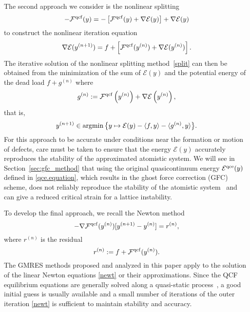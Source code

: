 \documentclass[12pt,reqno]{amsart}
\begin{document}
The second approach we consider is the nonlinear splitting
\begin{displaymath}
  -{{\mathcal{F}}^{{\rm qcf}}}(y)=-\left[{{\mathcal{F}}^{{\rm qcf}}}(y)+\nabla {\mathcal{E}} (y)\right] + \nabla {\mathcal{E}} (y)
\end{displaymath}
to construct the nonlinear iteration equation
\begin{equation}\label{split}
 \nabla {\mathcal{E}} (y^{(n+1)})=f+ \left[{{\mathcal{F}}^{{\rm qcf}}}(y^{(n)})+\nabla {\mathcal{E}} (y^{(n)})\right] .
\end{equation}
The iterative solution of the nonlinear splitting method~\eqref{split} can then
be obtained from the minimization of the sum of ${\mathcal{E}}(y)$ and the
potential energy of the dead load $f+g^{(n)}$ where
\[
g^{(n)}:={{\mathcal{F}}^{{\rm qcf}}}\left(y^{(n)}\right)+\nabla {\mathcal{E}} \left(y^{(n)}\right),
\]
that is,
\begin{equation*}
y^{(n+1)} \in {{\rm argmin}} \, \big\{ y \mapsto {\mathcal{E}}(y) - {\langle} f, y
{\rangle}- {\langle} g^{(n)}, y {\rangle} \big\}.
\end{equation*}
For this approach to be accurate under conditions near the formation
or motion of defects, care must be taken to ensure that the energy
${\mathcal{E}}(y)$ accurately reproduces the stability of the approximated
atomistic system.  We will see in Section~\ref{sec:gfc_method} that
using the original quasicontinuum energy ${{\mathcal{E}}^{{\rm qce}}}(y)$ {{{defined in
  \eqref{qce.equation}}}}, which results in the ghost force correction
(GFC) scheme, does not reliably reproduce the stability of the
atomistic system~\cite{doblusort:qce.stab} and can give a reduced
critical strain for a lattice instability.

To develop the final approach,
we recall the Newton method
\begin{equation}\label{newt}
-\nabla {{\mathcal{F}}^{{\rm qcf}}}(y^{(n)})[y^{(n+1)}-y^{(n)}]=r^{(n)},
\end{equation}
where $r^{(n)}$ is the residual
\begin{displaymath}
  r^{(n)}:=f+{{\mathcal{F}}^{{\rm qcf}}}(y^{(n)}).
\end{displaymath}
The GMRES methods proposed and analyzed in this paper apply to
the solution of the linear Newton equations \eqref{newt} or their
approximations.  Since the QCF equilibrium equations are generally
solved along a quasi-static process~\cite{dobsonluskin08}, a good
initial guess is usually available and a small number of iterations of
the outer iteration \eqref{newt} is sufficient to maintain stability
and accuracy.
\end{document}
